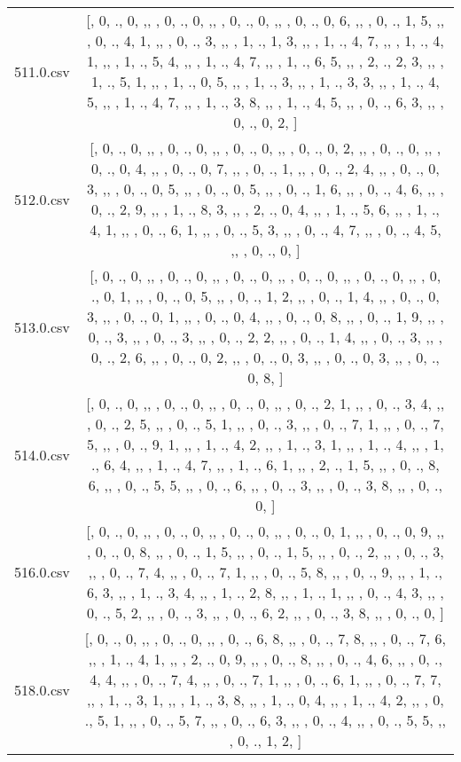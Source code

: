\begin{table}[ht]
\begin{tabular}{@{}c c@{}}
	511.0.csv & [, 0, ., 0, ,,  , 0, ., 0, ,,  , 0, ., 0, ,,  , 0, ., 0, 6, ,,  , 0, ., 1, 5, ,,  , 0, ., 4, 1, ,,  , 0, ., 3, ,,  , 1, ., 1, 3, ,,  , 1, ., 4, 7, ,,  , 1, ., 4, 1, ,,  , 1, ., 5, 4, ,,  , 1, ., 4, 7, ,,  , 1, ., 6, 5, ,,  , 2, ., 2, 3, ,,  , 1, ., 5, 1, ,,  , 1, ., 0, 5, ,,  , 1, ., 3, ,,  , 1, ., 3, 3, ,,  , 1, ., 4, 5, ,,  , 1, ., 4, 7, ,,  , 1, ., 3, 8, ,,  , 1, ., 4, 5, ,,  , 0, ., 6, 3, ,,  , 0, ., 0, 2, ]\\ 
	512.0.csv & [, 0, ., 0, ,,  , 0, ., 0, ,,  , 0, ., 0, ,,  , 0, ., 0, 2, ,,  , 0, ., 0, ,,  , 0, ., 0, 4, ,,  , 0, ., 0, 7, ,,  , 0, ., 1, ,,  , 0, ., 2, 4, ,,  , 0, ., 0, 3, ,,  , 0, ., 0, 5, ,,  , 0, ., 0, 5, ,,  , 0, ., 1, 6, ,,  , 0, ., 4, 6, ,,  , 0, ., 2, 9, ,,  , 1, ., 8, 3, ,,  , 2, ., 0, 4, ,,  , 1, ., 5, 6, ,,  , 1, ., 4, 1, ,,  , 0, ., 6, 1, ,,  , 0, ., 5, 3, ,,  , 0, ., 4, 7, ,,  , 0, ., 4, 5, ,,  , 0, ., 0, ]\\ 
	513.0.csv & [, 0, ., 0, ,,  , 0, ., 0, ,,  , 0, ., 0, ,,  , 0, ., 0, ,,  , 0, ., 0, ,,  , 0, ., 0, 1, ,,  , 0, ., 0, 5, ,,  , 0, ., 1, 2, ,,  , 0, ., 1, 4, ,,  , 0, ., 0, 3, ,,  , 0, ., 0, 1, ,,  , 0, ., 0, 4, ,,  , 0, ., 0, 8, ,,  , 0, ., 1, 9, ,,  , 0, ., 3, ,,  , 0, ., 3, ,,  , 0, ., 2, 2, ,,  , 0, ., 1, 4, ,,  , 0, ., 3, ,,  , 0, ., 2, 6, ,,  , 0, ., 0, 2, ,,  , 0, ., 0, 3, ,,  , 0, ., 0, 3, ,,  , 0, ., 0, 8, ]\\ 
	514.0.csv & [, 0, ., 0, ,,  , 0, ., 0, ,,  , 0, ., 0, ,,  , 0, ., 2, 1, ,,  , 0, ., 3, 4, ,,  , 0, ., 2, 5, ,,  , 0, ., 5, 1, ,,  , 0, ., 3, ,,  , 0, ., 7, 1, ,,  , 0, ., 7, 5, ,,  , 0, ., 9, 1, ,,  , 1, ., 4, 2, ,,  , 1, ., 3, 1, ,,  , 1, ., 4, ,,  , 1, ., 6, 4, ,,  , 1, ., 4, 7, ,,  , 1, ., 6, 1, ,,  , 2, ., 1, 5, ,,  , 0, ., 8, 6, ,,  , 0, ., 5, 5, ,,  , 0, ., 6, ,,  , 0, ., 3, ,,  , 0, ., 3, 8, ,,  , 0, ., 0, ]\\ 
	516.0.csv & [, 0, ., 0, ,,  , 0, ., 0, ,,  , 0, ., 0, ,,  , 0, ., 0, 1, ,,  , 0, ., 0, 9, ,,  , 0, ., 0, 8, ,,  , 0, ., 1, 5, ,,  , 0, ., 1, 5, ,,  , 0, ., 2, ,,  , 0, ., 3, ,,  , 0, ., 7, 4, ,,  , 0, ., 7, 1, ,,  , 0, ., 5, 8, ,,  , 0, ., 9, ,,  , 1, ., 6, 3, ,,  , 1, ., 3, 4, ,,  , 1, ., 2, 8, ,,  , 1, ., 1, ,,  , 0, ., 4, 3, ,,  , 0, ., 5, 2, ,,  , 0, ., 3, ,,  , 0, ., 6, 2, ,,  , 0, ., 3, 8, ,,  , 0, ., 0, ]\\ 
	518.0.csv & [, 0, ., 0, ,,  , 0, ., 0, ,,  , 0, ., 6, 8, ,,  , 0, ., 7, 8, ,,  , 0, ., 7, 6, ,,  , 1, ., 4, 1, ,,  , 2, ., 0, 9, ,,  , 0, ., 8, ,,  , 0, ., 4, 6, ,,  , 0, ., 4, 4, ,,  , 0, ., 7, 4, ,,  , 0, ., 7, 1, ,,  , 0, ., 6, 1, ,,  , 0, ., 7, 7, ,,  , 1, ., 3, 1, ,,  , 1, ., 3, 8, ,,  , 1, ., 0, 4, ,,  , 1, ., 4, 2, ,,  , 0, ., 5, 1, ,,  , 0, ., 5, 7, ,,  , 0, ., 6, 3, ,,  , 0, ., 4, ,,  , 0, ., 5, 5, ,,  , 0, ., 1, 2, ]\\ 

\end{tabular}
\end{table}
